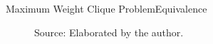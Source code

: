 \documentclass{beamer}
\newcommand{\Pp}{\mathscr{P}}
\newcommand{\source}[1]{\caption*{Source: {#1}} }
\begin{document}
\begin{frame}{Maximum Weight Clique Problem}{Equivalence}
\begin{figure}
		\source{Elaborated by the author.}
	\end{figure}
\end{frame}

		
		
		
\end{document}
